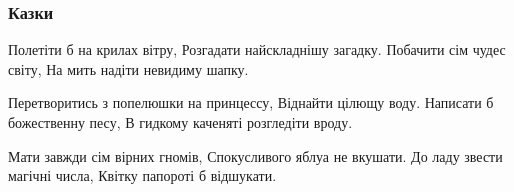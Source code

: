  
 
 

\subsubsection{Казки}
\label{sec:poetry.rus.olesja_gavryshko.kazky}

Полетіти б на крилах вітру,
Розгадати найскладнішу загадку.
Побачити сім чудес світу,
На мить надіти невидиму шапку.

Перетворитись з попелюшки на принцессу,
Віднайти цілющу воду.
Написати б божественну песу,
В гидкому каченяті розгледіти вроду.

Мати завжди сім вірних гномів,
Спокусливого яблуа не вкушати.
До ладу звести магічні числа,
Квітку папороті б відшукати.
